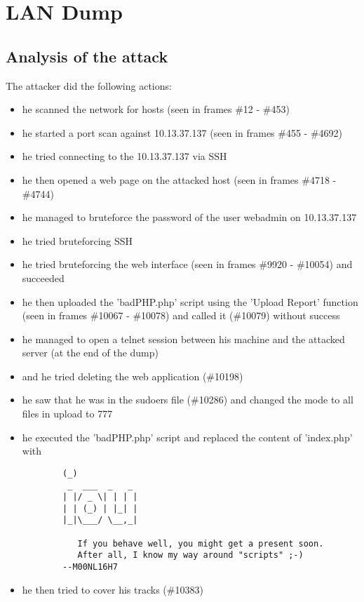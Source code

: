\section{LAN Dump}
\subsection{Analysis of the attack}
The attacker did the following actions:
\begin{itemize}
    \item he scanned the network for hosts (seen in frames \#12 - \#453)
    \item he started a port scan against 10.13.37.137 (seen in frames \#455 - \#4692)
    \item he tried connecting to the 10.13.37.137 via SSH
    \item he then opened a web page on the attacked host (seen in frames \#4718 - \#4744)
    \item he managed to bruteforce the password of the user webadmin on 10.13.37.137
    \item he tried bruteforcing SSH
    \item he tried bruteforcing the web interface (seen in frames \#9920 - \#10054) and succeeded
    \item he then uploaded the 'badPHP.php' script using the 'Upload Report' function (seen in frames \#10067 - \#10078) and called it (\#10079) without success
    \item he managed to open a telnet session between his machine and the attacked server (at the end of the dump)
    \item and he tried deleting the web application (\#10198)
    \item he saw that he was in the sudoers file (\#10286) and changed the mode to all files in upload to 777
    \item he executed the 'badPHP.php' script and replaced the content of 'index.php' with
    \begin{verbatim}
        (_)
         _  ___  _   _
        | |/ _ \| | | |
        | | (_) | |_| |
        |_|\___/ \__,_|

           If you behave well, you might get a present soon.
           After all, I know my way around "scripts" ;-)
        --M00NL16H7
    \end{verbatim}
    \item he then tried to cover his tracks (\#10383)
\end{itemize}

